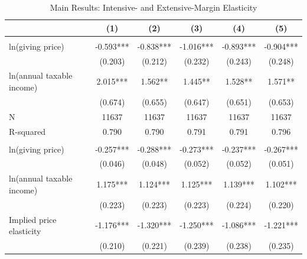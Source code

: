 \documentclass[ review  , 3p ]{elsarticle}
\begin{document}
  \begin{table}

  \caption{\label{tab:kableEstimateElasticityPart2}Main Results: Intensive- and Extensive-Margin Elasticity}
  \centering
  \fontsize{7}{9}\selectfont
  \begin{threeparttable}
  \begin{tabular}[t]{lccccc}
  \toprule
   & (1) & (2) & (3) & (4) & (5)\\
  \midrule
  \addlinespace[0.3em]
  \multicolumn{6}{l}{\textbf{Intensive-Margin Elasticity}}\\
  \hspace{1em}ln(giving price) & -0.593*** & -0.838*** & -1.016*** & -0.893*** & -0.904***\\
  \hspace{1em} & (0.203) & (0.212) & (0.232) & (0.243) & (0.248)\\
  \hspace{1em}ln(annual taxable income) & 2.015*** & 1.562** & 1.445** & 1.528** & 1.571**\\
  \hspace{1em} & (0.674) & (0.655) & (0.647) & (0.651) & (0.653)\\
  \hspace{1em}N & 11637 & 11637 & 11637 & 11637 & 11637\\
  \hspace{1em}R-squared & 0.790 & 0.790 & 0.791 & 0.791 & 0.796\\
  \addlinespace[0.3em]
  \multicolumn{6}{l}{\textbf{Extensive-Margin Elasticity}}\\
  \hspace{1em}ln(giving price) & -0.257*** & -0.288*** & -0.273*** & -0.237*** & -0.267***\\
  \hspace{1em} & (0.046) & (0.048) & (0.052) & (0.052) & (0.051)\\
  \hspace{1em}ln(annual taxable income) & 1.175*** & 1.124*** & 1.125*** & 1.139*** & 1.102***\\
  \hspace{1em} & (0.223) & (0.223) & (0.223) & (0.224) & (0.220)\\
  \hspace{1em}Implied price elasticity & -1.176*** & -1.320*** & -1.250*** & -1.086*** & -1.221***\\
  \hspace{1em} & (0.210) & (0.221) & (0.239) & (0.238) & (0.235)\\

\end{tabular}
\end{threeparttable}
\end{table}
\end{document}
